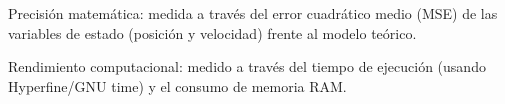 \begin{listaVD}
    \item Precisión matemática: medida a través del error cuadrático medio (MSE) de las variables de estado (posición y velocidad) frente al modelo teórico.
    \item Rendimiento computacional: medido a través del tiempo de ejecución (usando Hyperfine/GNU time) y el consumo de memoria RAM.
\end{listaVD}